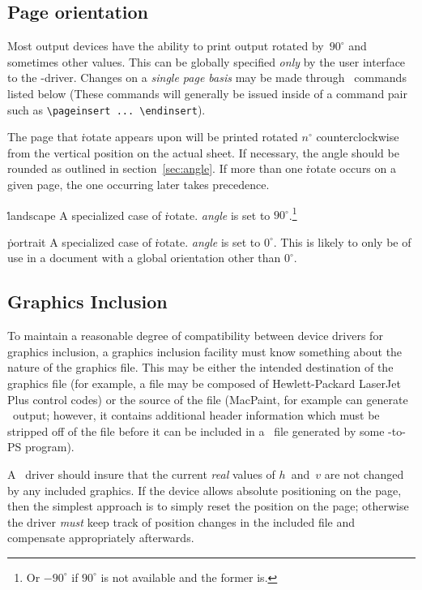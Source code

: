 \subsection{Page orientation}
Most output devices have the ability to print output rotated
by~$90^\circ$ and sometimes other values. This can be globally specified
{\sl only\/} by the user interface to the \DVI-driver. Changes on a {\sl
single page basis\/} may be made through \Special\ commands listed below
(These commands will generally be issued inside of a command pair
    such as
\verb|\pageinsert ... \endinsert|).
\begin{description}
\item[\.{rotate} {\it angle\/}] The page that \.{rotate} appears upon
         will be printed rotated $n^\circ$ counterclockwise from the
         vertical position on the actual sheet. If necessary, the
         angle should be rounded as outlined in section~\ref{sec:angle}.
         If more than one \.{rotate} occurs on a given page, the one
         occurring later takes precedence.
\item{\.{landscape}} A specialized case of \.{rotate}. {\it angle\/} is
         set to $90^\circ$.\footnote{Or $-90^\circ$ if $90^\circ$ is not
         available and the former is.}
\item{\.{portrait}} A specialized case of \.{rotate}. {\it angle\/} is
         set to $0^\circ$. This is likely to only be of use in a document
         with a global orientation other than $0^\circ$.
\end{description}

\subsection{Graphics Inclusion}
To maintain a reasonable degree of compatibility between device drivers
for graphics inclusion, a graphics inclusion facility must know something
about
           the nature of the graphics file. This may be either the
intended destination of the graphics file (for example, a file may
be composed of Hewlett-Packard LaserJet Plus control codes) or the
source of the file (MacPaint, for example can generate \PS\ output;
however, it contains additional header information which must be stripped
off of the file before it can be included in a \PS\ file generated by
some \DVI-to-PS program).

A \DVI\ driver should insure that the current {\em real\/} values of
$h$~and~$v$ are not changed by any included graphics. If the device
allows absolute positioning on the page, then the simplest approach
is to simply reset the position on the page; otherwise the driver
{\em must\/} keep track of position changes in the included file
and compensate appropriately afterwards.


